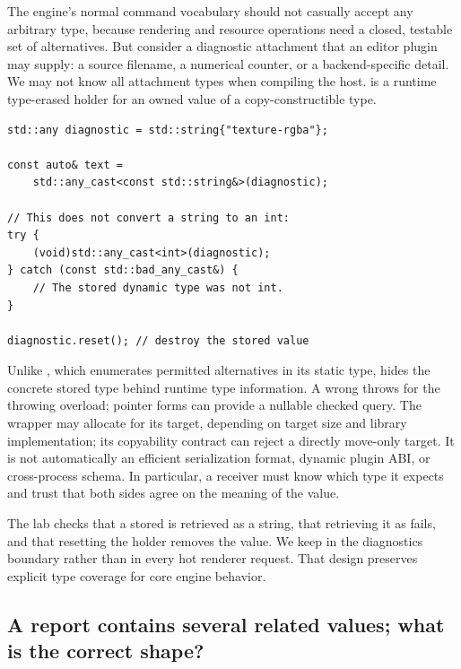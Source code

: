 The engine's normal command vocabulary should not casually accept any arbitrary type, because rendering and resource operations need a closed, testable set of alternatives. But consider a diagnostic attachment that an editor plugin may supply: a source filename, a numerical counter, or a backend-specific detail. We may not know all attachment types when compiling the host.  is a runtime type-erased holder for an owned value of a copy-constructible type.

\begin{verbatim}
std::any diagnostic = std::string{"texture-rgba"};

const auto& text =
    std::any_cast<const std::string&>(diagnostic);

// This does not convert a string to an int:
try {
    (void)std::any_cast<int>(diagnostic);
} catch (const std::bad_any_cast&) {
    // The stored dynamic type was not int.
}

diagnostic.reset(); // destroy the stored value
\end{verbatim}

Unlike , which enumerates permitted alternatives in its static type,  hides the concrete stored type behind runtime type information. A wrong  throws  for the throwing overload; pointer forms can provide a nullable checked query. The wrapper may allocate for its target, depending on target size and library implementation; its copyability contract can reject a directly move-only target. It is not automatically an efficient serialization format, dynamic plugin ABI, or cross-process schema. In particular, a receiver must know which type it expects and trust that both sides agree on the meaning of the value.

The lab checks that a stored  is retrieved as a string, that retrieving it as  fails, and that resetting the holder removes the value. We keep  in the diagnostics boundary rather than in every hot renderer request. That design preserves explicit type coverage for core engine behavior.

\subsection{A report contains several related values; what is the correct shape?}\label{05-engine-i-ch006-a-report-contains-several-related-values-what-is-the-correct-shape}

